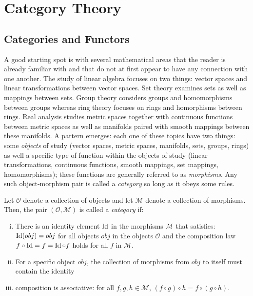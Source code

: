 \documentclass[../sean_thesis.tex]{subfiles}
\begin{document}
\chapter{Category Theory}
\section{Categories and Functors}
A good starting spot is with several mathematical areas that the reader is already familiar with and that do not at first appear to have any connection with one another. 
The study of linear algebra focuses on two things: vector spaces and linear transformations between vector spaces. Set theory examines sets as well as mappings between sets. Group theory considers groups and homomorphisms between groups whereas ring theory focuses on rings and homorphisms between rings. Real analysis studies metric spaces together with continuous functions between metric spaces as well as manifolds paired with smooth mappings between these manifolds. A pattern emerges: each one of these topics have two things: some \emph{objects} of study (vector spaces, metric spaces, manifolds, sets, groups, rings) as well a specific type of function within the objects of study (linear transformations, continuous functions, smooth mappings, set mappings, homomorphisms); these functions are generally referred to as \emph{morphisms}. Any such object-morphism pair is called a \emph{category} so long as it obeys some rules.

\begin{definition}[Category]
	Let $\mathcal{O}$ denote a collection of objects and let $\mathcal{M}$ denote a collection of morphisms. Then, the pair $(\mathcal{O}, \mathcal{M})$ is called a \emph{category} if:
	\vspace{-\varparskip}
	\begin{enumerate}[(i)]
		\item There is an identity element $\operatorname{Id}$ in the morphisms $\mathcal{M}$ that satisfies: $\operatorname{Id}(obj) = obj$ for all objects $obj$ in the objects $\mathcal{O}$ and the composition law $f \circ \operatorname{Id} = f = \operatorname{Id} \circ f$ holds for all $f$ in $\mathcal{M}$.
		\item For a specific object $obj$, the collection of morphisms from $obj$ to itself must contain the identity
		\item composition is associative: for all $f,g,h \in \mathcal{M}$,  $(f \circ g) \circ h = f \circ (g \circ h)$.
	\end{enumerate}
	\vspace{-\varparskip}
\end{definition}
\end{document}
